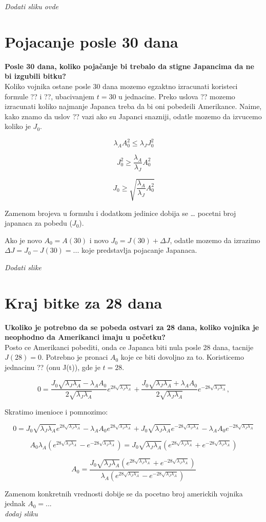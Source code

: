 \documentclass{article}
\newcommand{\laj}{\sqrt{\lambda_J\lambda_A}}
\begin{document}
\emph{Dodati sliku ovde}

\section*{Pojacanje posle 30 dana}

\textbf{Posle 30 dana, koliko pojačanje bi trebalo da stigne Japancima da ne bi
izgubili bitku?} \\

Koliko vojnika ostane posle 30 dana mozemo egzaktno izracunati koristeci
formule ?? i ??, ubacivanjem \(t = 30\) u jednacine. Preko uslova ??
mozemo izracunati koliko najmanje Japanca treba da bi oni pobedeili
Amerikance. Naime, kako znamo da uslov ?? vazi ako su Japanci snazniji,
odatle mozemo da izvucemo koliko je \(J_0\).

\[
  \lambda_{A}A_0^2 \leq \lambda_{J}J_0^2
\]

\[
  J_0^2 \geq \frac{\lambda_A}{\lambda_J} A_0^2
\]

\[
  J_0 \geq \sqrt{\frac{\lambda_A}{\lambda_J} A_0^2}
\]

Zamenom brojeva u formulu i dodatkom jedinice dobija se \ldots{} pocetni
broj japanaca za pobedu (\(J_0\)).

Ako je novo \(A_0 = A(30)\) i novo \(J_0 = J(30) + \Delta J\), odatle
mozemo da izrazimo \(\Delta J = J_0 - J(30) = ...\) koje predstavlja
pojacanje Japanaca.

\emph{Dodati slike}

\section*{Kraj bitke za 28 dana}

\textbf{Ukoliko je potrebno da se pobeda ostvari za 28 dana, koliko
vojnika je neophodno da Amerikanci imaju u
početku?} \\

Posto ce Amerikanci pobediti, onda ce Japanca biti nula posle 28 dana,
tacnije \(J(28) = 0\). Potrebno je pronaci \(A_0\) koje ce biti dovoljno
za to. Koristicemo jednacinu ?? (onu J(t)), gde je \(t = 28\).

\[
0 = \frac{J_0 \laj - \lambda_A A_0}{2\laj} e^{28 \laj } +
    \frac{J_0 \laj + \lambda_A A_0}{2 \laj } e^{-28 \laj },
\]

Skratimo imenioce i pomnozimo:

\[
  0 = J_0 \laj e^{28 \laj } - \lambda_A A_0 e^{28 \laj} +
  J_0 \laj e^{-28 \laj} - \lambda_A A_0 e^{-28 \laj}
\]

\[
  A_0 \lambda_A (e^{28 \laj} - e^{-28 \laj})
=
  J_0 \laj(e^{28 \laj} + e^{-28 \laj})
\]

\[
  A_0 =
  \frac{J_0 \laj(e^{28 \laj} + e^{-28 \laj})}
  {\lambda_A (e^{28 \laj} - e^{-28 \laj})}
\]

Zamenom konkretnih vrednosti dobije se da pocetno broj americkih vojnika
jednak \(A_0 = ...\) \\

\emph{dodaj sliku}
\end{document}
